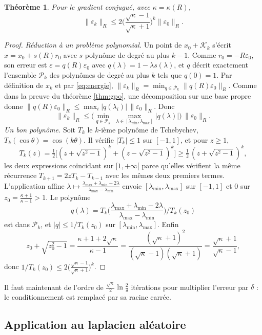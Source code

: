 \documentclass[11pt,a4paper]{article}
\theoremstyle{plain}
\newtheorem{theoreme}{Théorème}[section]
\theoremstyle{definition}
\theoremstyle{remark}
\newcommand{\K}{\mathcal{K}}
\begin{document}
\begin{theoreme}\label{thm:tcheb}
Pour le gradient conjugué, avec $\kappa=\kappa(R)$,
\[
  \|\varepsilon_k\|_R\leq2\Big(\frac{\sqrt\kappa-1}{\sqrt\kappa+1}\Big)^k\|\varepsilon_0\|_R .
\]
\end{theoreme}

\begin{proof}
\emph{Réduction à un problème polynomial.} Un point de $x_0+\K_k$ s'écrit $x=x_0+s(R)r_0$ avec $s$ polynôme de degré au plus $k-1$. Comme $r_0=-R\varepsilon_0$, son erreur est $\varepsilon=q(R)\varepsilon_0$ avec $q(\lambda)=1-\lambda s(\lambda)$, et $q$ décrit exactement l'ensemble $\mathcal P_k$ des polynômes de degré au plus $k$ tels que $q(0)=1$. Par définition de $x_k$ et par \eqref{eq:energie}, $\|\varepsilon_k\|_R=\min_{q\in\mathcal P_k}\|q(R)\varepsilon_0\|_R$. Comme dans la preuve du théorème \ref{thm:gpo}, une décomposition sur une base propre donne $\|q(R)\varepsilon_0\|_R\leq\max_i|q(\lambda_i)|\,\|\varepsilon_0\|_R$. Donc
\[
  \|\varepsilon_k\|_R\leq\Big(\min_{q\in\mathcal P_k}\ \max_{\lambda\in[\lambda_{\min},\lambda_{\max}]}|q(\lambda)|\Big)\,\|\varepsilon_0\|_R .
\]
\emph{Un bon polynôme.} Soit $T_k$ le $k$-ième polynôme de Tchebychev, $T_k(\cos\theta)=\cos(k\theta)$. Il vérifie $|T_k|\leq1$ sur $[-1,1]$, et pour $z\geq1$,
\[
  T_k(z)=\tfrac12\big[(z+\sqrt{z^2-1})^k+(z-\sqrt{z^2-1})^k\big]\geq\tfrac12\,(z+\sqrt{z^2-1})^k ,
\]
les deux expressions coïncidant sur $[1,+\infty[$ parce qu'elles vérifient la même récurrence $T_{k+1}=2zT_k-T_{k-1}$ avec les mêmes deux premiers termes. L'application affine $\lambda\mapsto\frac{\lambda_{\max}+\lambda_{\min}-2\lambda}{\lambda_{\max}-\lambda_{\min}}$ envoie $[\lambda_{\min},\lambda_{\max}]$ sur $[-1,1]$ et $0$ sur $z_0=\frac{\kappa+1}{\kappa-1}>1$. Le polynôme
\[
  q(\lambda)=T_k\Big(\frac{\lambda_{\max}+\lambda_{\min}-2\lambda}{\lambda_{\max}-\lambda_{\min}}\Big)\Big/T_k(z_0)
\]
est dans $\mathcal P_k$, et $|q|\leq1/T_k(z_0)$ sur $[\lambda_{\min},\lambda_{\max}]$. Enfin
\[
  z_0+\sqrt{z_0^2-1}=\frac{\kappa+1+2\sqrt\kappa}{\kappa-1}=\frac{(\sqrt\kappa+1)^2}{(\sqrt\kappa-1)(\sqrt\kappa+1)}=\frac{\sqrt\kappa+1}{\sqrt\kappa-1},
\]
donc $1/T_k(z_0)\leq2\big(\frac{\sqrt\kappa-1}{\sqrt\kappa+1}\big)^k$.
\end{proof}

Il faut maintenant de l'ordre de $\frac{\sqrt\kappa}2\ln\frac2\delta$ itérations pour multiplier l'erreur par $\delta$ : le conditionnement est remplacé par sa racine carrée.

\subsection{Application au laplacien aléatoire}
\end{document}
